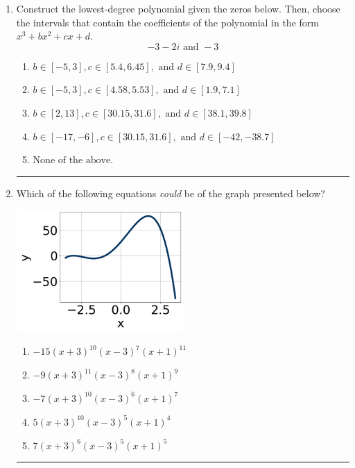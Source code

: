 \documentclass[14pt]{extbook}
\newcommand{\litem}[1]{\item#1\hspace*{-1cm}\rule{\textwidth}{0.4pt}}
\begin{document}
\begin{enumerate}
\litem{
Construct the lowest-degree polynomial given the zeros below. Then, choose the intervals that contain the coefficients of the polynomial in the form $x^3+bx^2+cx+d$.\[ -3 - 2 i \text{ and } -3 \]\begin{enumerate}[label=\Alph*.]
\item \( b \in [-5, 3], c \in [5.4, 6.45], \text{ and } d \in [7.9, 9.4] \)
\item \( b \in [-5, 3], c \in [4.58, 5.53], \text{ and } d \in [1.9, 7.1] \)
\item \( b \in [2, 13], c \in [30.15, 31.6], \text{ and } d \in [38.1, 39.8] \)
\item \( b \in [-17, -6], c \in [30.15, 31.6], \text{ and } d \in [-42, -38.7] \)
\item \( \text{None of the above.} \)

\end{enumerate} }
\litem{
Which of the following equations \textit{could} be of the graph presented below?
\begin{center}
    \includegraphics[width=0.5\textwidth]{../Figures/polyGraphToFunctionA.png}
\end{center}
\begin{enumerate}[label=\Alph*.]
\item \( -15(x + 3)^{10} (x - 3)^{7} (x + 1)^{11} \)
\item \( -9(x + 3)^{11} (x - 3)^{8} (x + 1)^{9} \)
\item \( -7(x + 3)^{10} (x - 3)^{6} (x + 1)^{7} \)
\item \( 5(x + 3)^{10} (x - 3)^{5} (x + 1)^{4} \)
\item \( 7(x + 3)^{6} (x - 3)^{5} (x + 1)^{5} \)


\end{enumerate}}
\end{enumerate}
\end{document}
